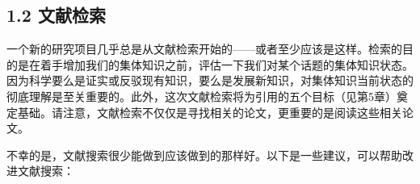 \subsection*{1.2 文献检索}
一个新的研究项目几乎总是从文献检索开始的——或者至少应该是这样。检索的目的是在着手增加我们的集体知识之前，评估一下我们对某个话题的集体知识状态。因为科学要么是证实或反驳现有知识，要么是发展新知识，对集体知识当前状态的彻底理解是至关重要的。此外，这次文献检索将为引用的五个目标（见第5章）奠定基础。请注意，文献检索不仅仅是寻找相关的论文，更重要的是阅读这些相关论文。

不幸的是，文献搜索很少能做到应该做到的那样好。以下是一些建议，可以帮助改进文献搜索：

